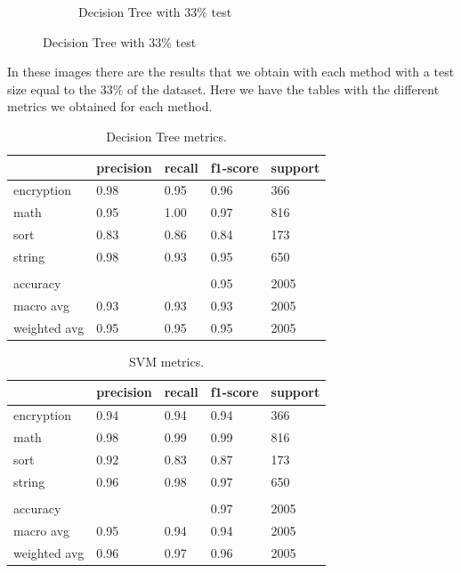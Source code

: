 \documentclass[11pt]{article}
\begin{document}
\begin{figure}
\begin{subfigure}{.5\textwidth}
  \caption{Decision Tree with 33\% test}
  \label{fig:dectree}
\end{subfigure}%
\label{fig:test}
\end{figure}

In these images there are the results that we obtain with each method with a test size equal to the 33\% of the dataset. Here we have the tables with the different metrics we obtained for each method.

\begin{table}[h]
\centering
\begin{tabular}{|l|l|l|l|l|}
\hline
             & precision & recall & f1-score & support \\ \hline
encryption   & 0.98      & 0.95   & 0.96     & 366     \\ \hline
math         & 0.95      & 1.00   & 0.97    & 816     \\ \hline
sort         & 0.83     & 0.86   & 0.84     & 173     \\ \hline
string       & 0.98      & 0.93   & 0.95     & 650     \\ \hline
             &           &        &          &         \\ \hline
accuracy     &           &        & 0.95     & 2005    \\ \hline
macro avg    & 0.93      & 0.93   & 0.93     & 2005    \\ \hline
weighted avg & 0.95      & 0.95   & 0.95    & 2005    \\ \hline
\end{tabular}
\caption{Decision Tree metrics.}
\end{table}

\begin{table}[h]
\centering
\begin{tabular}{|l|l|l|l|l|}
\hline
             & precision & recall & f1-score & support \\ \hline
encryption   & 0.94      & 0.94   & 0.94     & 366     \\ \hline
math         & 0.98      & 0.99   & 0.99     & 816     \\ \hline
sort         & 0.92      & 0.83   & 0.87     & 173     \\ \hline
string       & 0.96      & 0.98   & 0.97     & 650     \\ \hline
             &           &        &          &         \\ \hline
accuracy     &           &        & 0.97     & 2005    \\ \hline
macro avg    & 0.95      & 0.94   & 0.94     & 2005    \\ \hline
weighted avg & 0.96      & 0.97   & 0.96     & 2005    \\ \hline
\end{tabular}
\caption{SVM metrics.}
\end{table}
\end{document}
